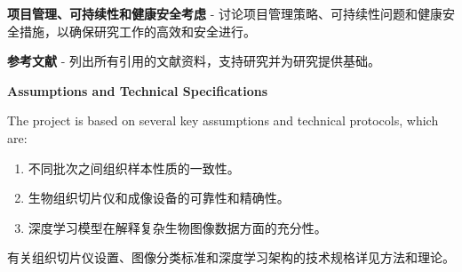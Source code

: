 \textbf{项目管理、可持续性和健康安全考虑} - 讨论项目管理策略、可持续性问题和健康安全措施，以确保研究工作的高效和安全进行。

\textbf{参考文献} - 列出所有引用的文献资料，支持研究并为研究提供基础。

\textbf{Assumptions and Technical Specifications}

The project is based on several key assumptions and technical protocols, which are:


\begin{enumerate}
    \item 不同批次之间组织样本性质的一致性。
    \item 生物组织切片仪和成像设备的可靠性和精确性。
    \item 深度学习模型在解释复杂生物图像数据方面的充分性。
\end{enumerate}
有关组织切片仪设置、图像分类标准和深度学习架构的技术规格详见方法和理论。

